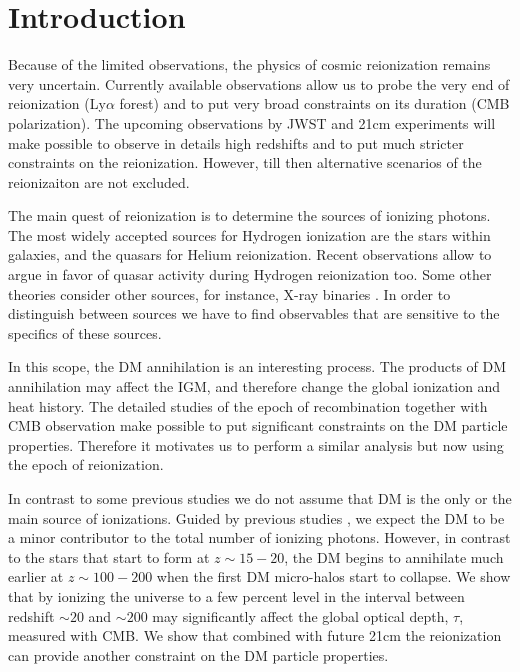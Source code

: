 \section{Introduction}

Because of the limited observations, the physics of cosmic reionization remains very uncertain. Currently available observations allow us to probe the very end of reionization (Ly$\alpha$ forest) and to put very broad constraints on its duration (CMB polarization). The upcoming observations by JWST and 21cm experiments will make possible to observe in details high redshifts and to put much stricter constraints on the reionization. However, till then alternative scenarios of the reionizaiton are not excluded.

The main quest of reionization is to determine the sources of ionizing photons. The most widely accepted sources for Hydrogen ionization are the stars within galaxies, and the quasars for Helium reionization. Recent observations allow \cite{2015arXiv150707678M} to argue in favor of quasar activity during Hydrogen reionization too. Some other theories consider other sources, for instance, X-ray binaries \cite{Fialkov_2014}. In order to distinguish between sources we have to find observables that are sensitive to the specifics of these sources.

In this scope, the DM annihilation is an interesting process. The products of DM annihilation may affect the IGM, and therefore change the global ionization and heat history. The detailed studies of the epoch of recombination \citet{2015arXiv150603811S} together with CMB observation \cite{2015arXiv150201589P} make possible to put significant constraints on the DM particle properties. Therefore it motivates us to perform a similar analysis but now using the epoch of reionization. 

In contrast to some previous studies \cite{2009JCAP...10..009C, 2009PhRvD..80c5007B} we do not assume that DM is the only or the main source of ionizations. Guided by previous studies \cite{H_tsi_2009}, we expect the DM to be a minor contributor to the total number of ionizing photons. However, in contrast to the stars that start to form at $z\sim 15-20$, the DM begins to annihilate much earlier at $z\sim100-200$ when the first DM micro-halos start to collapse. We show that by ionizing the universe to a few percent level in the interval between redshift $\sim20$ and $\sim200$ may significantly affect the global optical depth, $\tau$, measured with CMB. We show that combined with future 21cm the reionization can provide another constraint on the DM particle properties.

